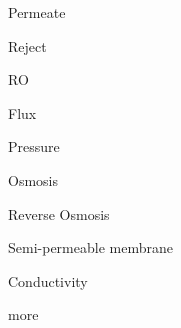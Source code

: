 

Permeate

Reject

RO

Flux

Pressure

Osmosis

Reverse Osmosis

Semi-permeable membrane

Conductivity

more



